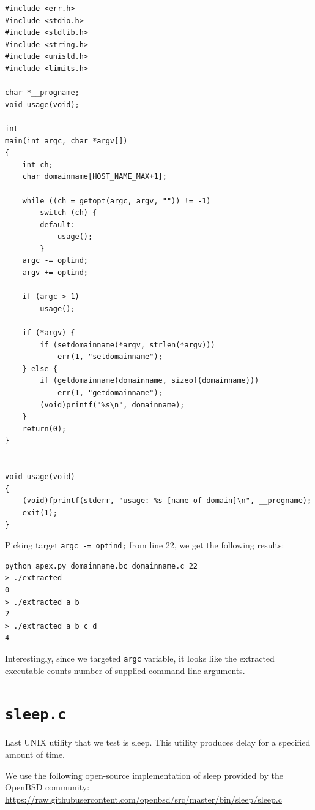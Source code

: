 \documentclass[12pt, twoside]{fithesis2}
\renewcommand{\_}{\leavevmode \kern0.07em\vbox{\hrule width0.4em}}
\begin{document}
\begin{verbatim}
#include <err.h>
#include <stdio.h>
#include <stdlib.h>
#include <string.h>
#include <unistd.h>
#include <limits.h>

char *__progname;
void usage(void);

int
main(int argc, char *argv[])
{
    int ch;
    char domainname[HOST_NAME_MAX+1];

    while ((ch = getopt(argc, argv, "")) != -1)
        switch (ch) {
        default:
            usage();
        }
    argc -= optind;
    argv += optind;

    if (argc > 1)
        usage();

    if (*argv) {
        if (setdomainname(*argv, strlen(*argv)))
            err(1, "setdomainname");
    } else {
        if (getdomainname(domainname, sizeof(domainname)))
            err(1, "getdomainname");
        (void)printf("%s\n", domainname);
    }
    return(0);
}


void usage(void)
{
    (void)fprintf(stderr, "usage: %s [name-of-domain]\n", __progname);
    exit(1);
}
\end{verbatim}

Picking target \texttt{argc -= optind;} from line 22, we get the
following results:

\begin{verbatim}
python apex.py domainname.bc domainname.c 22
> ./extracted
0
> ./extracted a b
2
> ./extracted a b c d
4
\end{verbatim}

Interestingly, since we targeted \texttt{argc} variable, it looks like
the extracted executable counts number of supplied command line arguments.

\section{\texttt{sleep.c}}
\label{sec:sleep}

Last UNIX utility that we test is sleep.
This utility produces delay for a specified amount of time.

We use the following open-source implementation of sleep provided by the
OpenBSD community:
\url{https://raw.githubusercontent.com/openbsd/src/master/bin/sleep/sleep.c}
\end{document}
